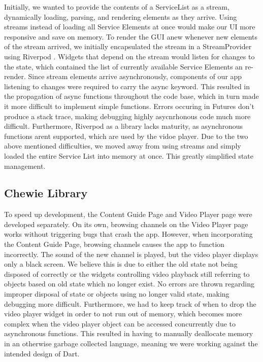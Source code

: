 \documentclass[conference]{IEEEtran}
\begin{document}
Initially, we wanted to provide the contents of a ServiceList as a stream, dynamically loading, parsing, and rendering elements as they arrive.
Using streams instead of loading all Service Elements at once would make our UI more responsive and save on memory.
To render the GUI anew whenever new elements of the stream arrived, we initially encapsulated the stream in a StreamProvider using Riverpod \cite{RiverPod}. Widgets that depend on the stream would listen for changes to the state, which contained the list of currently available Service Elements an re-render. Since stream elements arrive asynchronously, components of our app listening to changes were required to carry the async keyword. This resulted in the propagation of async functions throughout the code base, which in turn made it more difficult to implement simple functions. Errors occuring in Futures don't produce a stack trace, making debugging highly asycnrhonous code much more difficult. Furthermore, Riverpod as a library lacks maturity, as asynchronous functions arent supported, which are used by the vidoe player. Due to the two above mentioned difficulties, we moved away from using streams and simply loaded the entire Service List into memory at once. This greatly simplified state management.

\subsection{Chewie Library} 
To speed up development, the Content Guide Page and Video Player page were developed separately. On its own, browsing channels on the Video Player page works without triggering bugs that crash the app. However, when incorporating the Content Guide Page, browsing channels causes the app to function incorrectly. The sound of the new channel is played, but the video player displays only a black screen. We believe this is due to either the old state not being disposed of correctly or the widgets controlling video playback still referring to objects based on old state which no longer exist. No errors are thrown regarding improper disposal  of state or objects using no longer valid state, making debugging more difficult. Furthermore, we had to keep track of when to drop the video player widget in order to not run out of memory, which becomes more complex when the video player object can be accessed concurrently due to asynchronous functions. This resulted in having to manually deallocate memory in an otherwise garbage collected language, meaning we were working against the intended design of Dart.
\end{document}
